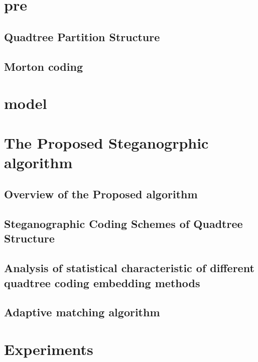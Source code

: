 \documentclass[journal,sort]{IEEEtran}
\begin{document}
\section{pre}

\subsection{Quadtree Partition Structure}
\subsection{Morton coding}

\section{model}

\section{The Proposed Steganogrphic algorithm}


\subsection{Overview of the Proposed algorithm}
\subsection{Steganographic Coding Schemes of Quadtree Structure}

\subsection{Analysis of statistical characteristic of different quadtree coding embedding methods}



\subsection{Adaptive matching algorithm}


\section{Experiments}




	
	
	
	
	
	
	
\end{document}
